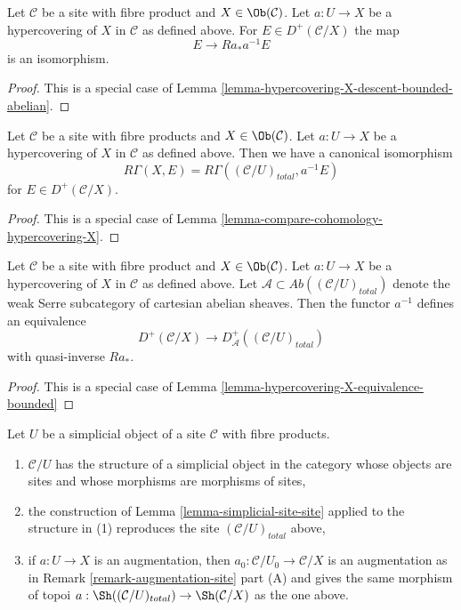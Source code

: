 \begin{lemma}
\label{lemma-hypercovering-X-simple-descent-bounded-abelian}
Let $\mathcal{C}$ be a site with fibre product and $X \in \Ob(\mathcal{C})$.
Let $a : U \to X$ be a hypercovering of $X$ in $\mathcal{C}$ as defined above.
For $E \in D^+(\mathcal{C}/X)$ the map
$$
E \longrightarrow Ra_*a^{-1}E
$$
is an isomorphism.
\end{lemma}

\begin{proof}
This is a special case of
Lemma \ref{lemma-hypercovering-X-descent-bounded-abelian}.
\end{proof}

\begin{lemma}
\label{lemma-compare-cohomology-hypercovering-X-simple}
Let $\mathcal{C}$ be a site with fibre products and $X \in \Ob(\mathcal{C})$.
Let $a : U \to X$ be a hypercovering of $X$ in $\mathcal{C}$ as defined above.
Then we have a canonical isomorphism
$$
R\Gamma(X, E) = R\Gamma((\mathcal{C}/U)_{total}, a^{-1}E)
$$
for $E \in D^+(\mathcal{C}/X)$.
\end{lemma}

\begin{proof}
This is a special case of
Lemma \ref{lemma-compare-cohomology-hypercovering-X}.
\end{proof}

\begin{lemma}
\label{lemma-hypercovering-X-simple-equivalence-bounded}
Let $\mathcal{C}$ be a site with fibre product and $X \in \Ob(\mathcal{C})$.
Let $a : U \to X$ be a hypercovering of $X$ in $\mathcal{C}$ as defined above.
Let $\mathcal{A} \subset \textit{Ab}((\mathcal{C}/U)_{total})$
denote the weak Serre subcategory of cartesian abelian sheaves.
Then the functor $a^{-1}$ defines an equivalence
$$
D^+(\mathcal{C}/X) \longrightarrow D_\mathcal{A}^+((\mathcal{C}/U)_{total})
$$
with quasi-inverse $Ra_*$.
\end{lemma}

\begin{proof}
This is a special case of
Lemma \ref{lemma-hypercovering-X-equivalence-bounded}
\end{proof}

\begin{lemma}
\label{lemma-sr-when-fibre-products}
Let $U$ be a simplicial object of a site $\mathcal{C}$
with fibre products.
\begin{enumerate}
\item $\mathcal{C}/U$ has the structure of a simplicial object
in the category whose objects are sites and
whose morphisms are morphisms of sites,
\item the construction of Lemma \ref{lemma-simplicial-site-site}
applied to the structure in (1)
reproduces the site $(\mathcal{C}/U)_{total}$ above,
\item if $a : U \to X$ is an augmentation, then
$a_0 : \mathcal{C}/U_0 \to \mathcal{C}/X$ is an augmentation
as in Remark \ref{remark-augmentation-site} part (A) and gives the
same morphism of topoi
$a : \Sh((\mathcal{C}/U)_{total}) \to \Sh(\mathcal{C}/X)$
as the one above.
\end{enumerate}
\end{lemma}

